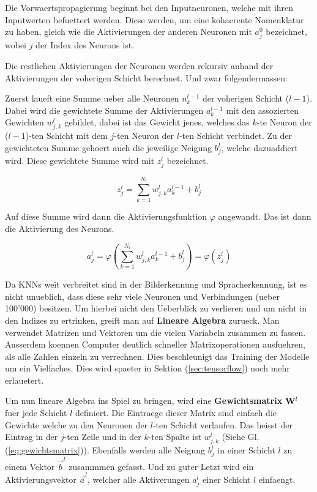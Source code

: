 \documentclass[../main]{subfiles}
\begin{document}
\par\bigskip
Die Vorwaertspropagierung beginnt bei den Inputneuronen, welche mit ihren
Inputwerten befuettert werden. Diese werden, um eine kohaerente Nomenklatur zu haben,
gleich wie die Aktivierungen der anderen Neuronen mit $a_j^0$ bezeichnet, wobei
$j$ der Index des Neurons ist.\par
Die restlichen Aktivierungen der Neuronen werden rekursiv anhand der
Aktivierungen der voherigen Schicht berechnet. Und zwar folgendermassen:\par
Zuerst laueft eine Summe ueber alle Neuronen $n_k^{l-1}$ der voherigen Schicht
($l-1$). Dabei wird die gewichtete Summe der Aktivierungen $a_k^{l-1}$ mit den
assozierten Gewichten $w_{j,k}^l$ gebildet, dabei ist das Gewicht jenes, welches das
$k$-te Neuron der ($l-1$)-ten Schicht mit dem $j$-ten Neuron der $l$-ten Schicht verbindet.
Zu der gewichteten Summe gehoert auch die jeweilige Neigung $b_j^l$, welche
dazuaddiert wird. Diese gewichtete Summe wird mit $z_j^l$ bezeichnet.

\begin{equation}\label{eq:gewichtete_summe_normal}
  z_j^l = \sum_{k=1}^{N_l} w_{j,k}^l a_k^{l-1} + b_j^l
\end{equation}

Auf diese Summe wird dann die Aktivierungsfunktion $\varphi$ angewandt.
Das ist dann die Aktivierung des Neurons.

\begin{equation}\label{eq:aktivierung_normal}
  a_j^l = \varphi\left(\sum_{k=1}^{N_l} w_{j,k}^l a_k^{l-1} + b_j^l \right) = \varphi \left( z_j^l \right)
\end{equation}
\par\bigskip
Da KNNs weit verbreitet sind in der Bilderkennung und Spracherkennung, ist es
nicht unueblich, dass diese sehr viele Neuronen und Verbindungen (ueber 100'000) besitzen.
Um hierbei nicht den Ueberblick zu verlieren und um nicht in den Indizes zu
ertrinken, greift man auf \textbf{Lineare Algebra} zurueck. Man verwendet
Matrizen und Vektoren um die vielen Variabeln zusammen zu fassen.
Ausserdem koennen Computer deutlich schneller Matrixoperationen ausfuehren, als
alle Zahlen einzeln zu verrechnen. Dies beschleunigt das Training der Modelle um
ein Vielfaches. Dies wird spaeter in Sektion
(\ref{sec:tensorflow}) noch mehr erlauetert.
\par\medskip
Um nun lineare Algebra ins Spiel zu bringen, wird eine \textbf{Gewichtsmatrix}
$\mathbf{W}^l$ fuer jede Schicht $l$ definiert.
Die Eintraege dieser Matrix sind einfach die Gewichte welche zu den Neuronen der
$l$-ten Schicht verlaufen. Das heisst der Eintrag in der $j$-ten Zeile und in
der $k$-ten Spalte ist $w_{j,k}^l$ (Siehe Gl. (\ref{eq:gewichtsmatrix})). Ebenfalls werden alle Neigung $b_j^l$ in
einer Schicht $l$ zu einem Vektor $\vec{b}^l$ zusammmen gefasst. Und zu guter
Letzt wird ein Aktivierungsvektor $\vec{a}^l$, welcher alle Aktiverungen $a_j^l$
einer Schicht $l$ einfaengt.
\end{document}
